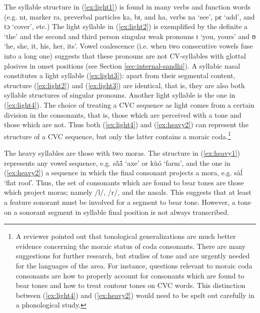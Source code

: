 
 The syllable structure in (\ref{ex:light1}) is  found in many verbs and
function words (e.g.  {\sls nɪ},  marker {\sls ra},
preverbal particles  {\sls ka},  {\sls bɪ}, and {\sls ha}, verbs {\sls na} 
`see', 
{\sls pɛ} `add',  and  {\sls tɔ} `cover', etc.) The light syllable in
(\ref{ex:light2}) is exemplified by the definite  {\sls a} `the' and
the
second and third person singular weak pronouns {\sls ɪ} `you, yours'  and  
{\sls 
ʊ}
 `he, she, it, his, her, its'. Vowel
coalescence (i.e. when two consecutive vowels fuse into a long one) suggests 
that these pronouns are not CV-syllables with glottal plosives in onset 
positions  (see Section \ref{sec:internal-sandhi}).  A syllabic nasal constitutes
a light syllable (\ref{ex:light3}): apart from their segmental content, 
structure (\ref{ex:light2}) and (\ref{ex:light3}) are identical, that is, they are also 
both syllable structures of singular pronouns.  Another light syllable is the 
one in (\ref{ex:light4}). The choice of treating a CVC sequence as light comes 
from a certain division in the consonants, that is,  those which are perceived 
with a tone and those which are not. Thus both (\ref{ex:light4}) and 
(\ref{ex:heavy2}) can represent the structure of a CVC sequence, but only the 
latter contains a moraic coda.\footnote{A reviewer pointed out that tonological generalizations are much better evidence concerning the moraic status of coda consonants. There are many  suggestions for further research, but studies of tone and  are urgently needed for the languages of the area. For instance, questions relevant to moraic coda consonants are how to  properly account for consonants which are found to bear tones and how to  treat contour tones on CVC words.  This distinction between (\ref{ex:light4}) and (\ref{ex:heavy2}) would need to be spelt out carefully in a phonological study.}



The heavy syllables are those with two moras. The structure  in 
(\ref{ex:heavy1}) represents any vowel sequence, e.g. {\sls sã̀ã́} `axe' or 
{\sls  kùó}  `farm', and the one in (\ref{ex:heavy2}) a sequence in which the 
final consonant projects a mora, e.g.  {\sls sàĺ} `flat  roof'. Thus, the set 
of consonants which are found to bear tones are those which project moras; namely /{l}/, /{r}/,  and the nasals. This suggests  that at least a feature 
{\sc sonorant}  must be involved for a segment to bear tone. However,  a tone on a {\sc sonorant} segment in syllable final position is not always transcribed. 


